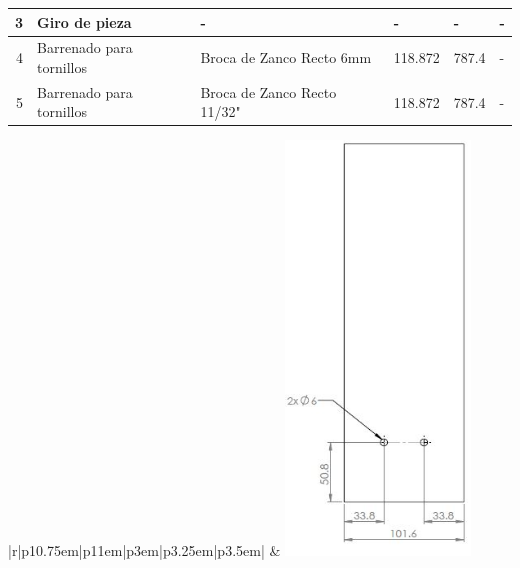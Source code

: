 \begin{table}[H]
\begin{tabular}{|r|p{10.75em}|p{11em}|p{3em}|p{3.25em}|p{3.5em}|}
    \hline
    \scriptsize 3     & \scriptsize Giro de pieza & \scriptsize -     & \scriptsize {-} & \scriptsize{-} & \scriptsize - \\
    \hline
    \scriptsize 4     & \scriptsize Barrenado para tornillos & \scriptsize Broca de Zanco Recto 6mm & \scriptsize 118.872 & \scriptsize 787.4 & \scriptsize - \\
    \hline
    \scriptsize 5     & \scriptsize Barrenado para tornillos & \scriptsize Broca de Zanco Recto 11/32" & \scriptsize 118.872 & \scriptsize 787.4 & \scriptsize - \\
    \hline
    \end{tabular}%
  \label{tab:EL_MC10}%
\end{table}%

\begin{table}[H]
  \centering
  \caption{Hoja de procesos de la pieza EL\_MC11}
    \begin{tabular}{|r|p{10.75em}|p{11em}|p{3em}|p{3.25em}|p{3.5em}|}
    \hline
     &  {\vspace{0.25mm} \centering  \includegraphics[angle=0,height=11cm]{imagenes/I_EL_MC11.JPG}}\\

\end{tabular}
\end{table}
